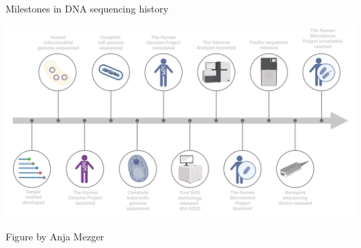 \documentclass[10pt]{beamer}
\newcommand{\creditdark}[1]{{\vspace{\fill} \par \raggedleft \scriptsize \mdseries \color{scMGray} #1 \par}}
\begin{document}
\begin{frame}[standout]{Milestones in DNA sequencing history}
	\vspace*{-1.1cm}
	\begin{center}
		\hspace*{-1.1cm}
		\includegraphics[width=1.2\textwidth]{./figures/timeline.png}
	\end{center}
	\creditdark{Figure by Anja Mezger}
\end{frame}
\end{document}
